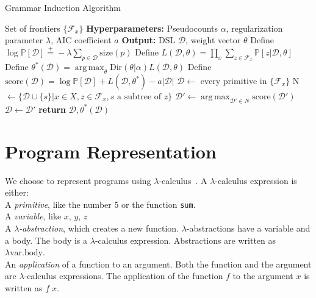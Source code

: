 \documentclass{article}
\DeclareMathOperator*{\argmax}{arg\,max} %
\newcommand{\probability}{\mathds{P}} %
\begin{document}
\begin{algorithm}[tb]
   \caption{Grammar Induction Algorithm}
   \label{grammarInductionAlgorithm}
   \begin{algorithmic}
      Set of frontiers $\{\mathcal{F}_x\}$
     \STATE \textbf{Hyperparameters:} Pseudocounts $\alpha$, regularization parameter $\lambda$, AIC coefficient $a$
     \STATE \textbf{Output:} DSL $\mathcal{D}$, weight vector $\theta$
     \STATE Define $\log \probability[\mathcal{D}]\stackrel{+}{ = } -\lambda\sum_{p\in \mathcal{D}} \text{size}(p)$
     \STATE Define $L(\mathcal{D},\theta) =  \prod_x \sum_{z\in \mathcal{F}_x} \probability[z|\mathcal{D},\theta]$
     \STATE Define $\theta^*(\mathcal{D}) = \argmax_\theta \text{Dir}(\theta|\alpha) L(\mathcal{D},\theta)$
     \STATE Define $\text{score}(\mathcal{D}) = \log \probability[\mathcal{D}] + L(\mathcal{D},\theta^*) - a|\mathcal{D}|$
     \STATE $\mathcal{D}\gets$ every primitive in $\{\mathcal{F}_x\}$
     \STATE N $\gets \{\mathcal{D}\cup \{s\} | x\in X, z\in \mathcal{F}_x, s\text{ a subtree of }z\}$
     \STATE $\mathcal{D}'\gets \argmax_{\mathcal{D}'\in N}\text{score}(\mathcal{D}') $
     \STATE $\mathcal{D}\gets\mathcal{D}'$
     \ELSE
     \STATE\textbf{return} $\mathcal{D},\theta^*(\mathcal{D})$
     \ENDIF
     \ENDWHILE
   \end{algorithmic}
\end{algorithm}
\section{Program Representation}
We choose to represent programs using $\lambda$-calculus~\cite{pierce}.
A $\lambda$-calculus expression is either:
\\\noindent A \emph{primitive}, like the number 5 or
  the function \texttt{sum}.
\\\noindent A \emph{variable}, like $x$, $y$, $z$
\\\noindent A $\lambda$\emph{-abstraction}, which creates a new function. $\lambda$-abstractions have a variable and a body. The body is a $\lambda$-calculus expression. Abstractions are written as $\lambda \text{var}. \text{body}$.
\\\noindent An \emph{application} of a function to an argument. Both the function and the argument are $\lambda$-calculus expressions. The application of the function $f$ to the argument $x$ is written as $f\; x$.
\end{document}
